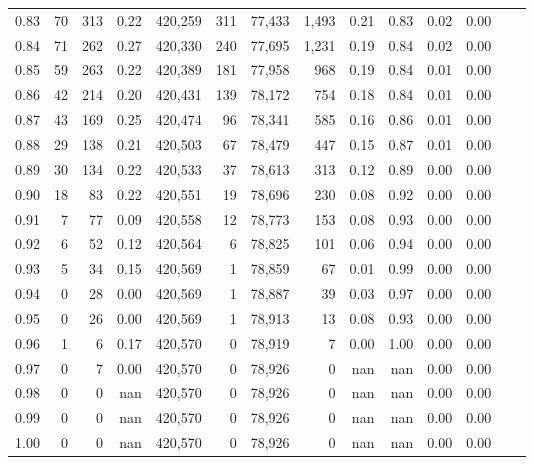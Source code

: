 \begin{tabular}{rrrrrrrrrrrrrr}
0.83 &      70 &    313 &    0.22 &  420,259 &      311 &  77,433 &   1,493 &  0.21 &  0.83 &  0.02 &      0.00 \\
0.84 &      71 &    262 &    0.27 &  420,330 &      240 &  77,695 &   1,231 &  0.19 &  0.84 &  0.02 &      0.00 \\
0.85 &      59 &    263 &    0.22 &  420,389 &      181 &  77,958 &     968 &  0.19 &  0.84 &  0.01 &      0.00 \\
0.86 &      42 &    214 &    0.20 &  420,431 &      139 &  78,172 &     754 &  0.18 &  0.84 &  0.01 &      0.00 \\
0.87 &      43 &    169 &    0.25 &  420,474 &       96 &  78,341 &     585 &  0.16 &  0.86 &  0.01 &      0.00 \\
0.88 &      29 &    138 &    0.21 &  420,503 &       67 &  78,479 &     447 &  0.15 &  0.87 &  0.01 &      0.00 \\
0.89 &      30 &    134 &    0.22 &  420,533 &       37 &  78,613 &     313 &  0.12 &  0.89 &  0.00 &      0.00 \\
0.90 &      18 &     83 &    0.22 &  420,551 &       19 &  78,696 &     230 &  0.08 &  0.92 &  0.00 &      0.00 \\
0.91 &       7 &     77 &    0.09 &  420,558 &       12 &  78,773 &     153 &  0.08 &  0.93 &  0.00 &      0.00 \\
0.92 &       6 &     52 &    0.12 &  420,564 &        6 &  78,825 &     101 &  0.06 &  0.94 &  0.00 &      0.00 \\
0.93 &       5 &     34 &    0.15 &  420,569 &        1 &  78,859 &      67 &  0.01 &  0.99 &  0.00 &      0.00 \\
0.94 &       0 &     28 &    0.00 &  420,569 &        1 &  78,887 &      39 &  0.03 &  0.97 &  0.00 &      0.00 \\
0.95 &       0 &     26 &    0.00 &  420,569 &        1 &  78,913 &      13 &  0.08 &  0.93 &  0.00 &      0.00 \\
0.96 &       1 &      6 &    0.17 &  420,570 &        0 &  78,919 &       7 &  0.00 &  1.00 &  0.00 &      0.00 \\
0.97 &       0 &      7 &    0.00 &  420,570 &        0 &  78,926 &       0 &   nan &   nan &  0.00 &      0.00 \\
0.98 &       0 &      0 &     nan &  420,570 &        0 &  78,926 &       0 &   nan &   nan &  0.00 &      0.00 \\
0.99 &       0 &      0 &     nan &  420,570 &        0 &  78,926 &       0 &   nan &   nan &  0.00 &      0.00 \\
1.00 &       0 &      0 &     nan &  420,570 &        0 &  78,926 &       0 &   nan &   nan &  0.00 &      0.00 \\
\bottomrule
\end{tabular}
